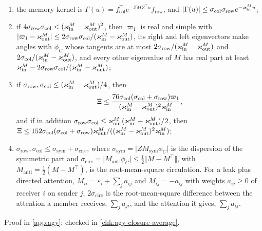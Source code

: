 \begin{theorem}
\begin{enumerate}
\begin{enumerate}
\item[(i)] the memory kernel is $\Gamma(u)=f_{\mathrm{col}}^\top e^{-ZMZ^\top u}f_{\mathrm{row}}$, and $\lvert\Gamma(u)\rvert\le\sigma_{\mathrm{col}}\sigma_{\mathrm{row}}e^{-\varkappa_{\mathrm{in}}^Mu}$;
\item[(ii)] if $4\sigma_{\mathrm{row}}\sigma_{\mathrm{col}}<(\varkappa_{\mathrm{in}}^M-\varkappa_{\mathrm{out}}^M)^2$, then $\varpi_1$ is real and simple with $\lvert\varpi_1-\varkappa_{\mathrm{out}}^M\rvert\le2\sigma_{\mathrm{row}}\sigma_{\mathrm{col}}/(\varkappa_{\mathrm{in}}^M-\varkappa_{\mathrm{out}}^M)$, its right and left eigenvectors make angles with $\phi_C$ whose tangents are at most $2\sigma_{\mathrm{row}}/(\varkappa_{\mathrm{in}}^M-\varkappa_{\mathrm{out}}^M)$ and $2\sigma_{\mathrm{col}}/(\varkappa_{\mathrm{in}}^M-\varkappa_{\mathrm{out}}^M)$, and every other eigenvalue of $M$ has real part at least $\varkappa_{\mathrm{in}}^M-2\sigma_{\mathrm{row}}\sigma_{\mathrm{col}}/(\varkappa_{\mathrm{in}}^M-\varkappa_{\mathrm{out}}^M)$;
\item[(iii)] if $\sigma_{\mathrm{row}},\sigma_{\mathrm{col}}\le(\varkappa_{\mathrm{in}}^M-\varkappa_{\mathrm{out}}^M)/4$, then
\begin{equation}\label{eq:agy-markov-gen}
\Xi\le\frac{76\sigma_{\mathrm{col}}(\sigma_{\mathrm{col}}+\sigma_{\mathrm{row}})\varpi_1}{(\varkappa_{\mathrm{in}}^M-\varkappa_{\mathrm{out}}^M)^2\varkappa_{\mathrm{in}}^M},
\end{equation}
and if in addition $\sigma_{\mathrm{row}}\sigma_{\mathrm{col}}\le\varkappa_{\mathrm{out}}^M(\varkappa_{\mathrm{in}}^M-\varkappa_{\mathrm{out}}^M)/2$, then $\Xi\le152\sigma_{\mathrm{col}}(\sigma_{\mathrm{col}}+\sigma_{\mathrm{row}})\varkappa_{\mathrm{out}}^M/((\varkappa_{\mathrm{in}}^M-\varkappa_{\mathrm{out}}^M)^2\varkappa_{\mathrm{in}}^M)$;
\item[(iv)] $\sigma_{\mathrm{row}},\sigma_{\mathrm{col}}\le\sigma_{\mathrm{sym}}+\sigma_{\mathrm{circ}}$, where $\sigma_{\mathrm{sym}}=\lvert ZM_{\mathrm{sym}}\phi_C\rvert$ is the dispersion of the symmetric part and $\sigma_{\mathrm{circ}}=\lvert M_{\mathrm{anti}}\phi_C\rvert\le\frac12\Vert M-M^\top\Vert$, with $M_{\mathrm{anti}}=\frac12(M-M^\top)$, is the root-mean-square circulation. For a leak plus directed attention, $M_{ii}=\varepsilon_i+\sum_ja_{ij}$ and $M_{ij}=-a_{ij}$ with weights $a_{ij}\ge0$ of receiver $i$ on sender $j$, $2\sigma_{\mathrm{circ}}$ is the root-mean-square difference between the attention a member receives, $\sum_ja_{ji}$, and the attention it gives, $\sum_ja_{ij}$.
\end{enumerate}
\end{enumerate}
Proof in \cref{app:agy}; checked in \cref{chk:agy-closure-average}.
\end{theorem}

